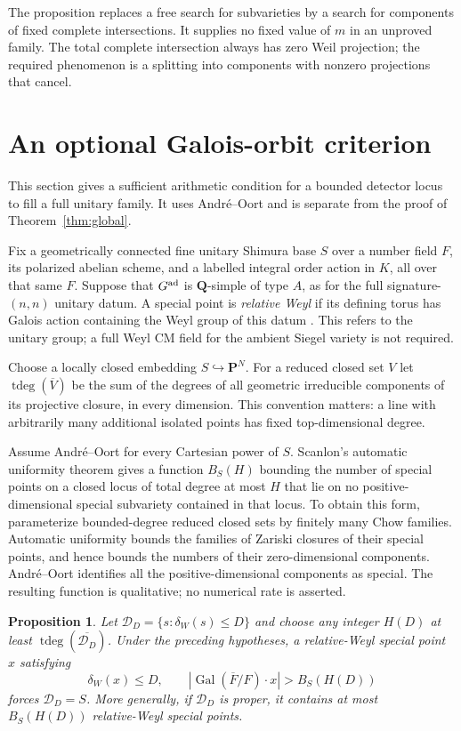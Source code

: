 \documentclass[11pt]{article}
\newtheorem{proposition}[theorem]{Proposition}
\theoremstyle{definition}
\theoremstyle{remark}
\newcommand{\Q}{\mathbf Q}
\begin{document}
The proposition replaces a free search for subvarieties by a search for components of fixed complete intersections. It supplies no fixed value of $m$ in an unproved family. The total complete intersection always has zero Weil projection; the required phenomenon is a splitting into components with nonzero projections that cancel.

\section{An optional Galois-orbit criterion}
\label{sec:galois}
This section gives a sufficient arithmetic condition for a bounded detector locus to fill a full unitary family. It uses Andr\'e--Oort and is separate from the proof of Theorem~\ref{thm:global}.

Fix a geometrically connected fine unitary Shimura base $S$ over a number field $F$, its polarized abelian scheme, and a labelled integral order action in $K$, all over that same $F$. Suppose that $G^{\rm ad}$ is $\Q$-simple of type $A$, as for the full signature-$(n,n)$ unitary datum. A special point is \emph{relative Weyl} if its defining torus has Galois action containing the Weyl group of this datum \cite[Definitions~5.3--5.4]{ChaiOort}. This refers to the unitary group; a full Weyl CM field for the ambient Siegel variety is not required.

Choose a locally closed embedding $S\hookrightarrow\mathbf P^N$. For a reduced closed set $V$ let $\operatorname{tdeg}(\overline V)$ be the sum of the degrees of all geometric irreducible components of its projective closure, in every dimension. This convention matters: a line with arbitrarily many additional isolated points has fixed top-dimensional degree.

Assume Andr\'e--Oort for every Cartesian power of $S$. Scanlon's automatic uniformity theorem \cite[Theorem~4.2]{Scanlon} gives a function $B_S(H)$ bounding the number of special points on a closed locus of total degree at most $H$ that lie on no positive-dimensional special subvariety contained in that locus. To obtain this form, parameterize bounded-degree reduced closed sets by finitely many Chow families. Automatic uniformity bounds the families of Zariski closures of their special points, and hence bounds the numbers of their zero-dimensional components. Andr\'e--Oort identifies all the positive-dimensional components as special. The resulting function is qualitative; no numerical rate is asserted.

\begin{proposition}\label{prop:galois-witness}
Let $\mathcal D_D=\{s:\delta_W(s)\leq D\}$ and choose any integer $H(D)$ at least $\operatorname{tdeg}(\overline{\mathcal D_D})$. Under the preceding hypotheses, a relative-Weyl special point $x$ satisfying
\[
 \delta_W(x)\leq D,\qquad
 |\operatorname{Gal}(\overline F/F)\cdot x|>B_S(H(D))
\]
forces $\mathcal D_D=S$. More generally, if $\mathcal D_D$ is proper, it contains at most $B_S(H(D))$ relative-Weyl special points.
\end{proposition}
\end{document}
